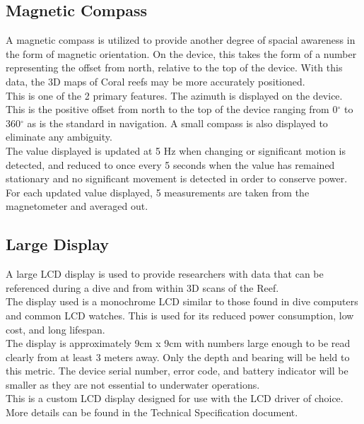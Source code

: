 \documentclass{article}
\begin{document}
\subsection{Magnetic Compass}
A magnetic compass is utilized to provide another degree of spacial awareness in the form of magnetic orientation. On the device, this takes the form of a number representing the offset from north, relative to the top of the device. With this data, the 3D maps of Coral reefs may be more accurately positioned.\\[12pt]
This is one of the 2 primary features. The azimuth is displayed on the device. This is the positive offset from north to the top of the device ranging from 0$^{\circ}$ to 360$^{\circ}$ as is the standard in navigation. A small compass is also displayed to eliminate any ambiguity.\\[12pt]
The value displayed is updated at 5 Hz when changing or significant motion is detected, and reduced to once every 5 seconds when the value has remained stationary and no significant movement is detected in order to conserve power. For each updated value displayed, 5 measurements are taken from the magnetometer and averaged out.

\subsection{Large Display}
A large LCD display is used to provide researchers with data that can be referenced during a dive and from within 3D scans of the Reef.\\[12pt]
The display used is a monochrome LCD similar to those found in dive computers and common LCD watches. This is used for its reduced power consumption, low cost, and long lifespan.\\[12pt]
The display is approximately 9cm x 9cm with numbers large enough to be read clearly from at least 3 meters away. Only the depth and bearing will be held to this metric. The device serial number, error code, and battery indicator will be smaller as they are not essential to underwater operations.\\[12pt]
This is a custom LCD display designed for use with the LCD driver of choice. More details can be found in the Technical Specification document.
\end{document}

